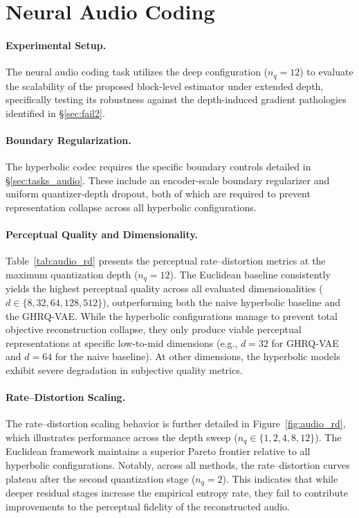 \documentclass[12pt]{report}
\begin{document}
\section{Neural Audio Coding}
\label{sec:exp_audio}

\paragraph{Experimental Setup.}
The neural audio coding task utilizes the deep configuration ($n_q=12$) to evaluate the scalability of the proposed block-level estimator under extended depth, specifically testing its robustness against the depth-induced gradient pathologies identified in \S\ref{sec:fail2}. 

\paragraph{Boundary Regularization.}
The hyperbolic codec requires the specific boundary controls detailed in \S\ref{sec:tasks_audio}. These include an encoder-scale boundary regularizer and uniform quantizer-depth dropout, both of which are required to prevent representation collapse across all hyperbolic configurations.

\paragraph{Perceptual Quality and Dimensionality.}
Table~\ref{tab:audio_rd} presents the perceptual rate--distortion metrics at the maximum quantization depth ($n_q=12$). The Euclidean baseline consistently yields the highest perceptual quality across all evaluated dimensionalities ($d \in \{8, 32, 64, 128, 512\}$), outperforming both the naive hyperbolic baseline and the GHRQ-VAE. While the hyperbolic configurations manage to prevent total objective reconstruction collapse, they only produce viable perceptual representations at specific low-to-mid dimensions (e.g., $d=32$ for GHRQ-VAE and $d=64$ for the naive baseline). At other dimensions, the hyperbolic models exhibit severe degradation in subjective quality metrics.

\paragraph{Rate--Distortion Scaling.}
The rate--distortion scaling behavior is further detailed in Figure~\ref{fig:audio_rd}, which illustrates performance across the depth sweep ($n_q\in\{1,2,4,8,12\}$). The Euclidean framework maintains a superior Pareto frontier relative to all hyperbolic configurations. Notably, across all methods, the rate--distortion curves plateau after the second quantization stage ($n_q=2$). This indicates that while deeper residual stages increase the empirical entropy rate, they fail to contribute improvements to the perceptual fidelity of the reconstructed audio.
\end{document}
